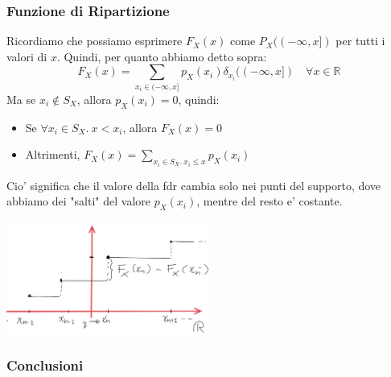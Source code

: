 \subsubsection{Funzione di Ripartizione}
Ricordiamo che possiamo esprimere $ F_X(x) $ come $ P_X((-\infty, x]) $ per tutti i valori di $ x $. Quindi, per quanto abbiamo detto sopra:
\[
  F_X(x) = \sum_{x_i \in (-\infty, x]} p_X(x_i)\delta_{x_i}((-\infty, x]) \quad \forall x \in \mathbb{R}
\]
Ma se $ x_i \notin S_X $, allora $ p_X(x_i) = 0 $, quindi:
\begin{itemize}
  \item Se $ \forall x_i \in S_X.\ x < x_i $, allora $ F_X(x) = 0 $
  \item Altrimenti, $ F_X(x) = \sum_{x_i \in S_X.\ x_i \leq x} p_X(x_i) $
\end{itemize}
Cio' significa che il valore della fdr cambia solo nei punti del supporto, dove abbiamo dei "salti" del valore $ p_X(x_i) $, mentre del resto e' costante.
\begin{center}
  \includegraphics[width=0.5\textwidth]{img/2025-04-02-10-14-30.png}
\end{center}
\subsubsection{Conclusioni}

